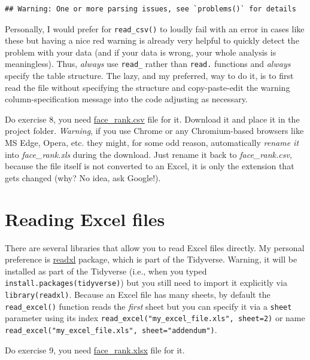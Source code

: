 \documentclass[
]{book}
\begin{document}
\begin{verbatim}
## Warning: One or more parsing issues, see `problems()` for details
\end{verbatim}

Personally, I would prefer for \texttt{read\_csv()} to loudly fail with an error in cases like these but having a nice red warning is already very helpful to quickly detect the problem with your data (and if your data is wrong, your whole analysis is meaningless). Thus, \emph{always} use \texttt{read\_} rather than \texttt{read.} functions and \emph{always} specify the table structure. The lazy, and my preferred, way to do it, is to first read the file without specifying the structure and copy-paste-edit the warning column-specification message into the code adjusting as necessary.

Do exercise 8, you need \href{data/face_rank.csv}{face\_rank.csv} file for it. Download it and place it in the project folder. \emph{Warning}, if you use Chrome or any Chromium-based browsers like MS Edge, Opera, etc. they might, for some odd reason, automatically \emph{rename it} into \emph{face\_rank.xls} during the download. Just rename it back to \emph{face\_rank.csv}, because the file itself is not converted to an Excel, it is only the extension that gets changed (why? No idea, ask Google!).

\hypertarget{readxl}{%
\section{Reading Excel files}\label{readxl}}

There are several libraries that allow you to read Excel files directly. My personal preference is \href{https://readxl.tidyverse.org/}{readxl} package, which is part of the Tidyverse. Warning, it will be installed as part of the Tidyverse (i.e., when you typed \texttt{install.packages(tidyverse)}) but you still need to import it explicitly via \texttt{library(readxl)}. Because an Excel file has many sheets, by default the \texttt{read\_excel()} function reads the \emph{first} sheet but you can specify it via a \texttt{sheet} parameter using its index \texttt{read\_excel("my\_excel\_file.xls",\ sheet=2)} or name \texttt{read\_excel("my\_excel\_file.xls",\ sheet="addendum")}.

Do exercise 9, you need \href{data/face_rank.xlsx}{face\_rank.xlsx} file for it.
\end{document}
